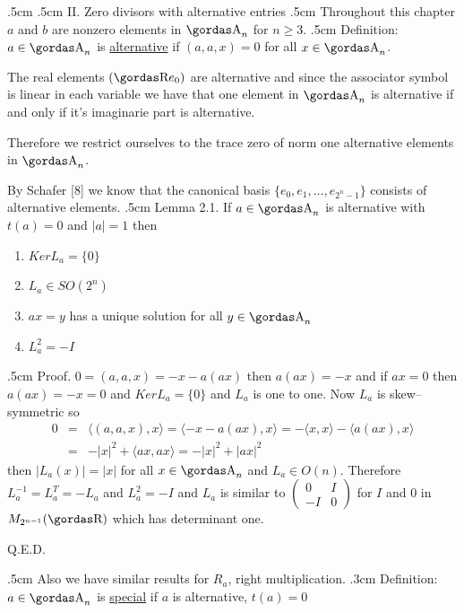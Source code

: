 \vglue.5cm
\noindent
\newpage
\vglue.5cm
\noindent
{\bsbf II. Zero divisors with alternative entries}
\vglue.5cm
Throughout this chapter $a$ and $b$ are nonzero elements in $\a_{n}$ for
$n\ge 3$.
\vglue.5cm
\noindent
{\bsbf Definition:} $a\in \a_{n}$ is \underline{alternative} if $(a,a,x)=0$ for all
$x\in \a_{n}$.
\par 
The real elements $(\erre e_{0})$ are alternative and since the associator symbol 
is linear in each variable we have that one element in $\a_{n}$ is alternative if 
and only if it's imaginarie part is alternative. 
\par 
Therefore we restrict 
ourselves to the trace zero of norm one alternative elements in $\a_{n}$.
\par 
By Schafer [8] we know that the canonical basis $\{e_{0},e_{1},\ldots,e_{2^n-1}\}$
consists of alternative elements.
\vglue.5cm
\noindent
{\bsbf Lemma 2.1.} If $a\in \a_{n}$ is alternative with $t(a)=0$ and $|a|=1$ then
\par 
\begin{enumerate}
\item[i)] $Ker L_{a}=\{0\}$
\item[ii)]$L_{a}\in SO(2^{n})$
\item[iii)]$ax=y$ has a unique solution for all $y\in \a_{n}$
\item[iv)]$L^{2}_{a}=-I$
\end{enumerate}
\vglue.5cm
\noindent
{\bsbf Proof.} $0=(a,a,x)=-x-a(ax)$ then $a(ax)=-x$ and if
$ax=0$ then $a(ax)=-x=0$ and $Ker L_{a}=\{0\}$ and $L_{a}$ is one to one.
Now $L_{a}$ is skew--symmetric so
\begin{eqnarray*}
0&=&\langle(a,a,x),x\rangle=\langle -x-a(ax),x\rangle=-\langle x,x\rangle-
\langle a(ax),x\rangle\\
&=&-|x|^{2}+\langle ax,ax\rangle=-|x|^{2}+|ax|^{2}
\end{eqnarray*}
then $|L_{a}(x)|=|x|$ for all $x\in \a_{n}$ and $L_{a}\in O(n)$. Therefore
$L_{a}^{-1}=L^{T}_{a}=-L_{a}$ and $L^{2}_{a}=-I$ and $L_{a}$ is similar to
$
\left( 
\begin{array}{cc}
0&I\\ -I&0
\end{array}\right)
$ 
for $I$ and $0$ in
$M_{2^{n-1}}(\erre)$ which has determinant one.
\begin{flushright}
Q.E.D.
\end{flushright}
\vglue.5cm 
\noindent
Also we have similar results for $R_{a}$, right multiplication.
\vglue.3cm
\noindent
{\bsbf Definition:} $a\in \a_{n}$ is \underline{special} if $a$ is alternative, $t(a)=0$
